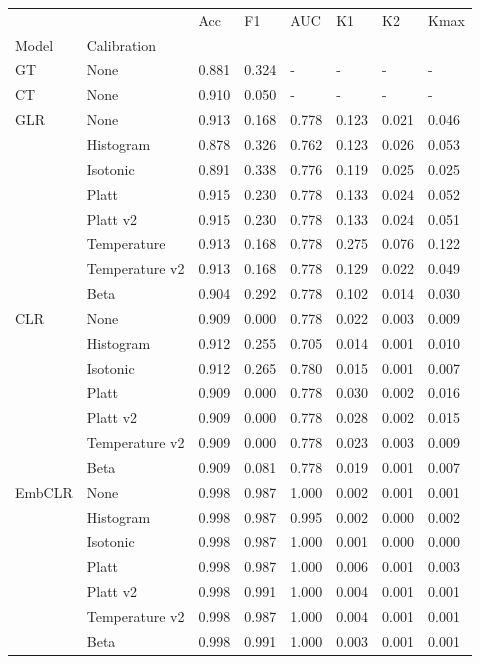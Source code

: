 \begin{tabular}{llllllll}
\toprule
 &  & Acc & F1 & AUC & K1 & K2 & Kmax \\
Model & Calibration &  &  &  &  &  &  \\
\midrule
GT & None & 0.881 & 0.324 & - & - & - & - \\
\cline{1-8}
CT & None & 0.910 & 0.050 & - & - & - & - \\
\cline{1-8}
\multirow[t]{8}{*}{GLR} & None & 0.913 & 0.168 & 0.778 & 0.123 & 0.021 & 0.046 \\
 & Histogram & 0.878 & 0.326 & 0.762 & 0.123 & 0.026 & 0.053 \\
 & Isotonic & 0.891 & 0.338 & 0.776 & 0.119 & 0.025 & 0.025 \\
 & Platt & 0.915 & 0.230 & 0.778 & 0.133 & 0.024 & 0.052 \\
 & Platt v2 & 0.915 & 0.230 & 0.778 & 0.133 & 0.024 & 0.051 \\
 & Temperature & 0.913 & 0.168 & 0.778 & 0.275 & 0.076 & 0.122 \\
 & Temperature v2 & 0.913 & 0.168 & 0.778 & 0.129 & 0.022 & 0.049 \\
 & Beta & 0.904 & 0.292 & 0.778 & 0.102 & 0.014 & 0.030 \\
\cline{1-8}
\multirow[t]{7}{*}{CLR} & None & 0.909 & 0.000 & 0.778 & 0.022 & 0.003 & 0.009 \\
 & Histogram & 0.912 & 0.255 & 0.705 & 0.014 & 0.001 & 0.010 \\
 & Isotonic & 0.912 & 0.265 & 0.780 & 0.015 & 0.001 & 0.007 \\
 & Platt & 0.909 & 0.000 & 0.778 & 0.030 & 0.002 & 0.016 \\
 & Platt v2 & 0.909 & 0.000 & 0.778 & 0.028 & 0.002 & 0.015 \\
 & Temperature v2 & 0.909 & 0.000 & 0.778 & 0.023 & 0.003 & 0.009 \\
 & Beta & 0.909 & 0.081 & 0.778 & 0.019 & 0.001 & 0.007 \\
\cline{1-8}
\multirow[t]{7}{*}{EmbCLR} & None & 0.998 & 0.987 & 1.000 & 0.002 & 0.001 & 0.001 \\
 & Histogram & 0.998 & 0.987 & 0.995 & 0.002 & 0.000 & 0.002 \\
 & Isotonic & 0.998 & 0.987 & 1.000 & 0.001 & 0.000 & 0.000 \\
 & Platt & 0.998 & 0.987 & 1.000 & 0.006 & 0.001 & 0.003 \\
 & Platt v2 & 0.998 & 0.991 & 1.000 & 0.004 & 0.001 & 0.001 \\
 & Temperature v2 & 0.998 & 0.987 & 1.000 & 0.004 & 0.001 & 0.001 \\
 & Beta & 0.998 & 0.991 & 1.000 & 0.003 & 0.001 & 0.001 \\
\cline{1-8}
\bottomrule
\end{tabular}
